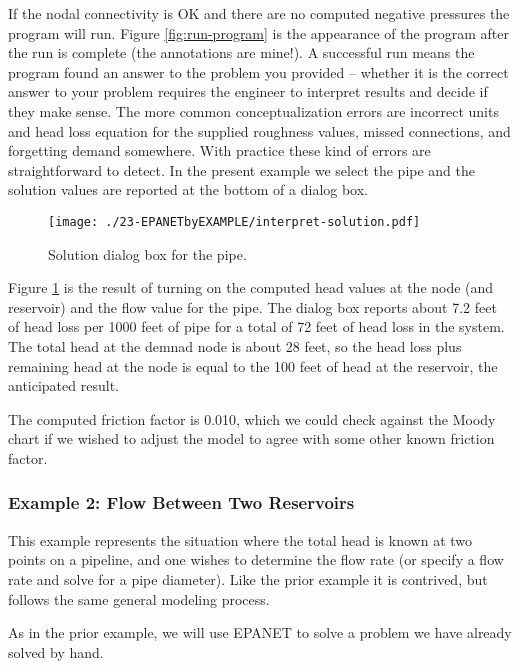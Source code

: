 If the nodal connectivity is OK and there are no computed negative pressures the program will run.   Figure \ref{fig:run-program}  is the appearance of the program after the run is complete (the annotations are mine!).
A successful run means the program found an answer to the problem you provided -- whether it is the correct answer to your problem requires the engineer to interpret results and decide if they make sense.  The more common conceptualization errors are incorrect units and head loss equation for the supplied roughness values, missed connections, and forgetting demand somewhere.  With practice these kind of errors are straightforward to detect.   In the present example we select the pipe and the solution values are reported at the bottom of a dialog box.


\begin{figure}[htbp] %
   \centering
   \texttt{[image: ./23-EPANETbyEXAMPLE/interpret-solution.pdf]} 
   \caption{Solution dialog box for the pipe.}
   \label{fig:interpret-solution}
\end{figure}

Figure \ref{fig:interpret-solution} is the result of turning on the computed head values at the node (and reservoir) and the flow value for the pipe.  The dialog box reports about 7.2 feet of head loss per 1000 feet of pipe for a total of 72 feet of head loss in the system.   The total head at the demnad node is about 28 feet, so the head loss plus remaining head at the node is equal to the 100 feet of head at the reservoir, the anticipated result.  

The computed friction factor is 0.010, which we could check against the Moody chart if we wished to adjust the model to agree with some other known friction factor.   
\clearpage
\subsubsection{Example 2: Flow Between Two Reservoirs}
This example represents the situation where the total head is known at two points on a pipeline, and one wishes to determine the flow rate (or specify a flow rate and solve for a pipe diameter).   Like the prior example it is contrived, but follows the same general modeling process.

As in the prior example, we will use EPANET to solve a problem we have already solved by hand.

